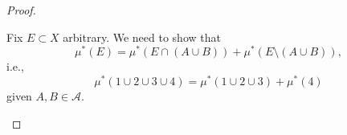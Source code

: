 \begin{proof}
\begin{enumerate}
\begin{enumerate}
\begin{itemize}
\begin{claim}
				                  \end{claim}
				                  \begin{explanation}
					                  Fix \(E\subset X\) arbitrary. We need to show that
					                  \[
						                  \mu^{*} (E) = \mu^{*} (E\cap (A\cup B)) + \mu^{*} (E\setminus (A\cup B)),
					                  \]
					                  i.e.,
					                  \[
						                  \mu^{*} (1\cup 2\cup 3\cup 4) = \mu^{*} (1\cup 2\cup 3) + \mu^{*} (4)
					                  \]
					                  given \(A, B\in\mathcal{A}\).
					                  \begin{figure}[H]
						                  \centering
						                  \label{fig:thm:Caratheodory-extension-Thm-1a}
					                  \end{figure}


\end{explanation}
\end{itemize}
\end{enumerate}
\end{enumerate}
\end{proof}
